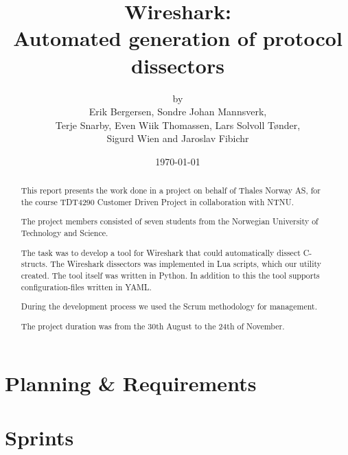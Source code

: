 \documentclass[a4paper, 11pt]{report}
\title{Wireshark:\\ Automated generation of protocol dissectors}
\author{by\\ Erik Bergersen, Sondre Johan Mannsverk,\\ Terje Snarby,
		Even Wiik Thomassen, Lars Solvoll Tønder,\\ Sigurd Wien
		and Jaroslav Fibichr}
\date{\today}
\begin{document}
\maketitle

\begin{abstract}
This report presents the work done in a project on behalf of 
Thales Norway AS, for the course TDT4290 Customer Driven Project in 
collaboration with NTNU.

The project members consisted of seven students from the Norwegian University 
of Technology and Science.

The task was to develop a tool for Wireshark that could automatically
dissect C-structs. The Wireshark dissectors was implemented in Lua scripts, 
which our utility created. The tool itself was written in Python. In addition 
to this the tool supports configuration-files written in YAML.

During the development process we used the Scrum methodology for
management. 

The project duration was from the 30th August to the 24th of November.

\end{abstract}

\tableofcontents

\part{Planning \& Requirements}








\part{Sprints}




\end{document}
